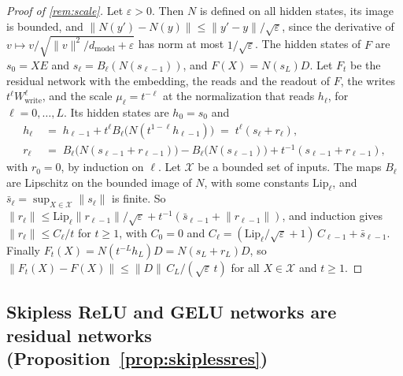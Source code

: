 \documentclass[10pt]{article}
\theoremstyle{definition}
\theoremstyle{remark}
\newcommand{\Wwrite}{W_{\mathrm{write}}}
\newcommand{\dm}{d_{\mathrm{model}}}
\newcommand{\norm}[1]{\lVert #1\rVert}
\begin{document}
\begin{proof}[Proof of \cref{rem:scale}]
Let $\varepsilon > 0$. Then $N$ is defined on all hidden states, its image is bounded, and $\norm{N(y') - N(y)} \le \norm{y' - y}/\sqrt{\varepsilon}$, since the derivative of $v \mapsto v/\sqrt{\norm{v}^2/\dm + \varepsilon}$ has norm at most $1/\sqrt{\varepsilon}$. The hidden states of $F$ are $s_0 = XE$ and $s_\ell = B_\ell(N(s_{\ell-1}))$, and $F(X) = N(s_L)D$. Let $F_t$ be the residual network with the embedding, the reads and the readout of $F$, the writes $t^\ell\Wwrite^{\ell}$, and the scale $\mu_\ell = t^{-\ell}$ at the normalization that reads $h_\ell$, for $\ell = 0, \dots, L$. Its hidden states are $h_0 = s_0$ and
\begin{align*}
h_\ell \;&=\; h_{\ell-1} + t^\ell B_\ell\big(N(t^{1-\ell}h_{\ell-1})\big) \;=\; t^\ell(s_\ell + r_\ell),\\
r_\ell \;&=\; B_\ell\big(N(s_{\ell-1} + r_{\ell-1})\big) - B_\ell\big(N(s_{\ell-1})\big) + t^{-1}(s_{\ell-1} + r_{\ell-1}),
\end{align*}
with $r_0 = 0$, by induction on $\ell$. Let $\mathcal X$ be a bounded set of inputs. The maps $B_\ell$ are Lipschitz on the bounded image of $N$, with some constants $\mathrm{Lip}_\ell$, and $\bar s_\ell = \sup_{X \in \mathcal X}\norm{s_\ell}$ is finite. So $\norm{r_\ell} \le \mathrm{Lip}_\ell\norm{r_{\ell-1}}/\sqrt{\varepsilon} + t^{-1}(\bar s_{\ell-1} + \norm{r_{\ell-1}})$, and induction gives $\norm{r_\ell} \le C_\ell/t$ for $t \ge 1$, with $C_0 = 0$ and $C_\ell = (\mathrm{Lip}_\ell/\sqrt{\varepsilon} + 1)\,C_{\ell-1} + \bar s_{\ell-1}$. Finally $F_t(X) = N(t^{-L}h_L)D = N(s_L + r_L)D$, so $\norm{F_t(X) - F(X)} \le \norm{D}\,C_L/(\sqrt{\varepsilon}\,t)$ for all $X \in \mathcal X$ and $t \ge 1$.
\end{proof}

\subsection{Skipless ReLU and GELU networks are residual networks\texorpdfstring{ (Proposition~\ref*{prop:skiplessres})}{}}\label{app:prf-skiplessres}

\propSkiplessRes*
\end{document}
